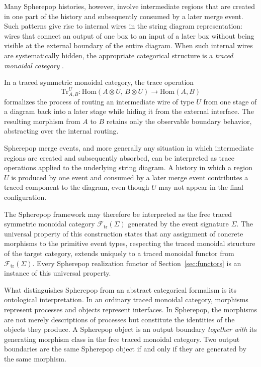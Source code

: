 \documentclass[12pt]{article}
\theoremstyle{plain}
\theoremstyle{definition}
\theoremstyle{remark}
\begin{document}
Many Spherepop histories, however, involve intermediate regions that are
created in one part of the history and subsequently consumed by a later merge
event.  Such patterns give rise to internal wires in the string diagram
representation: wires that connect an output of one box to an input of a later
box without being visible at the external boundary of the entire diagram.  When
such internal wires are systematically hidden, the appropriate categorical
structure is a \emph{traced monoidal category} \citep{BaezStay2010}.

In a traced symmetric monoidal category, the trace operation
\[
  \mathrm{Tr}^{U}_{A,B} : \mathrm{Hom}(A \otimes U,\, B \otimes U)
  \to \mathrm{Hom}(A,B)
\]
formalizes the process of routing an intermediate wire of type $U$ from one
stage of a diagram back into a later stage while hiding it from the external
interface.  The resulting morphism from $A$ to $B$ retains only the observable
boundary behavior, abstracting over the internal routing.

Spherepop merge events, and more generally any situation in which intermediate
regions are created and subsequently absorbed, can be interpreted as trace
operations applied to the underlying string diagram.  A history in which a
region $U$ is produced by one event and consumed by a later merge event
contributes a traced component to the diagram, even though $U$ may not appear
in the final configuration.

The Spherepop framework may therefore be interpreted as the free traced
symmetric monoidal category $\mathcal{F}_{\mathrm{tr}}(\Sigma)$ generated by
the event signature $\Sigma$.  The universal property of this construction
states that any assignment of concrete morphisms to the primitive event types,
respecting the traced monoidal structure of the target category, extends
uniquely to a traced monoidal functor from $\mathcal{F}_{\mathrm{tr}}(\Sigma)$.
Every Spherepop realization functor of Section~\ref{sec:functors} is an instance
of this universal property.

What distinguishes Spherepop from an abstract categorical formalism is its
ontological interpretation.  In an ordinary traced monoidal category, morphisms
represent processes and objects represent interfaces.  In Spherepop, the
morphisms are not merely descriptions of processes but constitute the identities
of the objects they produce.  A Spherepop object is an output boundary
\emph{together with} its generating morphism class in the free traced monoidal
category.  Two output boundaries are the same Spherepop object if and only if
they are generated by the same morphism.
\end{document}
